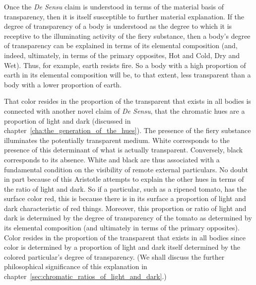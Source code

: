 Once the \emph{De Sensu} claim is understood in terms of the material basis of transparency, then it is itself susceptible to further material explanation. If the degree of transparency of a body is understood as the degree to which it is receptive to the illuminating activity of the fiery substance, then a body's degree of transparency can be explained in terms of its elemental composition (and, indeed, ultimately, in terms of the primary opposites, Hot and Cold, Dry and Wet). Thus, for example, earth resists fire. So a body with a high proportion of earth in its elemental composition will be, to that extent, less transparent than a body with a lower proportion of earth.

That color resides in the proportion of the transparent that exists in all bodies is connected with another novel claim of \emph{De Sensu}, that the chromatic hues are a proportion of light and dark (discussed in chapter~\ref{cha:the_generation_of_the_hues}). The presence of the fiery substance illuminates the potentially transparent me\-di\-um. White corresponds to the presence of this determinant of what is actually transparent. Conversely, black corresponds to its absence. White and black are thus associated with a fundamental condition on the visibility of remote external particulars. No doubt in part because of this Aristotle attempts to explain the other hues in terms of the ratio of light and dark. So if a particular, such as a ripened tomato, has the surface color red, this is because there is in its surface a proportion of light and dark characteristic of red things. Moreover, this proportion or ratio of light and dark is determined by the degree of transparency of the tomato as determined by its elemental composition (and ultimately in terms of the primary opposites). Color resides in the proportion of the transparent that exists in all bodies since color is determined by a proportion of light and dark itself determined by the colored particular's degree of transparency. (We shall discuss the further philosophical significance of this explanation in chapter~\ref{sec:chromatic_ratios_of_light_and_dark}.)

